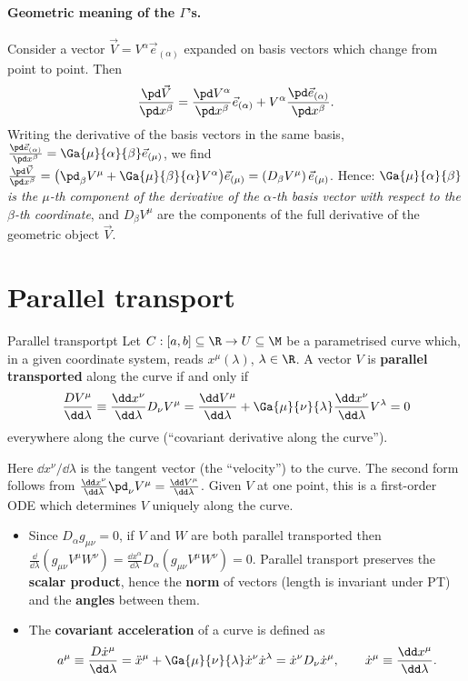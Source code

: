 \paragraph{Geometric meaning of the $\Gamma$'s.} Consider a vector $\vec V=V^\alpha\vec e_{(\alpha)}$ expanded on basis vectors which change from point to point. Then
\[
  \frac{\pd\vec V}{\pd x^\beta}=\frac{\pd V^\alpha}{\pd x^\beta}\vec e_{(\alpha)}+V^\alpha\frac{\pd\vec e_{(\alpha)}}{\pd x^\beta}.
\]
Writing the derivative of the basis vectors in the same basis, $\frac{\pd\vec e_{(\alpha)}}{\pd x^\beta}=\Ga{\mu}{\alpha}{\beta}\vec e_{(\mu)}$, we find $\frac{\pd\vec V}{\pd x^\beta}=\big(\pd_\beta V^\mu+\Ga{\mu}{\beta}{\alpha}V^\alpha\big)\vec e_{(\mu)}=(D_\beta V^\mu)\,\vec e_{(\mu)}$. Hence: \emph{$\Ga{\mu}{\alpha}{\beta}$ is the $\mu$-th component of the derivative of the $\alpha$-th basis vector with respect to the $\beta$-th coordinate}, and $D_\beta V^\mu$ are the components of the full derivative of the geometric object $\vec V$.

\section{Parallel transport}

\begin{definition}{Parallel transport}{pt}
Let $C:[a,b]\subseteq\R\to U\subseteq\M$ be a parametrised curve which, in a given coordinate system, reads $x^\mu(\lambda)$, $\lambda\in\R$. A vector $V$ is \textbf{parallel transported} along the curve if and only if
\begin{equation}
  \frac{DV^\mu}{\dd\lambda}\equiv\frac{\dd x^\nu}{\dd\lambda}D_\nu V^\mu=\frac{\dd V^\mu}{\dd\lambda}+\Ga{\mu}{\nu}{\lambda}\frac{\dd x^\nu}{\dd\lambda}V^\lambda=0
\end{equation}
everywhere along the curve (``covariant derivative along the curve'').
\end{definition}
Here $\dd x^\nu/\dd\lambda$ is the tangent vector (the ``velocity'') to the curve. The second form follows from $\frac{\dd x^\nu}{\dd\lambda}\pd_\nu V^\mu=\frac{\dd V^\mu}{\dd\lambda}$. Given $V$ at one point, this is a first-order ODE which determines $V$ uniquely along the curve.

\begin{remarkbox}[Properties]
\begin{itemize}[nosep]
\item Since $D_\alpha g_{\mu\nu}=0$, if $V$ and $W$ are both parallel transported then
$\frac{\dd}{\dd\lambda}(g_{\mu\nu}V^\mu W^\nu)=\frac{\dd x^\alpha}{\dd\lambda}D_\alpha(g_{\mu\nu}V^\mu W^\nu)=0$. Parallel transport preserves the \textbf{scalar product}, hence the \textbf{norm} of vectors (length is invariant under PT) and the \textbf{angles} between them.
\item The \textbf{covariant acceleration} of a curve is defined as
\begin{equation}
  a^\mu\equiv\frac{D\dot x^\mu}{\dd\lambda}=\ddot x^\mu+\Ga{\mu}{\nu}{\lambda}\dot x^\nu\dot x^\lambda=\dot x^\nu D_\nu\dot x^\mu,\qquad \dot x^\mu\equiv\frac{\dd x^\mu}{\dd\lambda}.
\end{equation}
\end{itemize}
\end{remarkbox}

